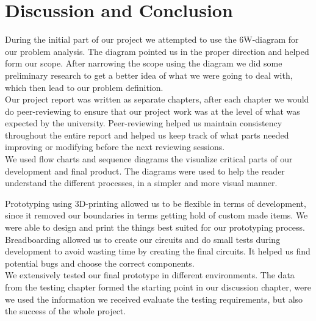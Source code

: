 \section{Discussion and Conclusion}

During the initial part of our project we attempted to use the 6W-diagram for our problem analysis. The diagram pointed us in the proper direction and helped form our scope. After narrowing the scope using the diagram we did some preliminary research to get a better idea of what we were going to deal with, which then lead to our problem definition.\\
Our project report was written as separate chapters, after each chapter we would do peer-reviewing to ensure that our project work was at the level of what was expected by the university. Peer-reviewing helped us maintain consistency throughout the entire report and helped us keep track of what parts needed improving or modifying before the next reviewing sessions.\\
We used flow charts and sequence diagrams the visualize critical parts of our development and final product. The diagrams were used to help the reader understand the different processes, in a simpler and more visual manner. 

Prototyping using 3D-printing allowed us to be flexible in terms of development, since it removed our boundaries in terms getting hold of custom made items. We were able to design and print the things best suited for our prototyping process. Breadboarding allowed us to create our circuits and do small tests during development to avoid wasting time by creating the final circuits. It helped us find potential bugs and choose the correct components.\\
We extensively tested our final prototype in different environments. The data from the testing chapter formed the starting point in our discussion chapter, were we used the information we received evaluate the testing requirements, but also the success of the whole project.
